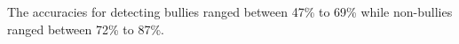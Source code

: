 The accuracies for detecting bullies ranged between 47\% to 69\% while non-bullies ranged between 72\% to 87\%.